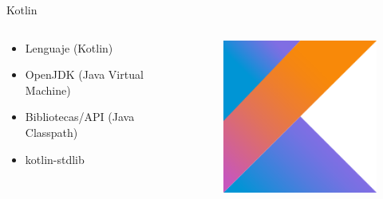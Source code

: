 \documentclass[aspectratio=169]{beamer}
\begin{document}
\begin{frame}[fragile]{Kotlin}
    \begin{columns}
        \begin{column}{0.5\textwidth}
            \begin{itemize}
                \item Lenguaje (Kotlin)
                \item OpenJDK (Java Virtual Machine)
                \item Bibliotecas/API (Java Classpath)
                \item kotlin-stdlib
            \end{itemize}
        \end{column}
        \begin{column}{0.5\textwidth}  %
            \begin{figure}
                \centering
                \includegraphics[width=0.4\linewidth]{Images/kotlin}
            \end{figure}
        \end{column}
    \end{columns}
\end{frame}
\end{document}
